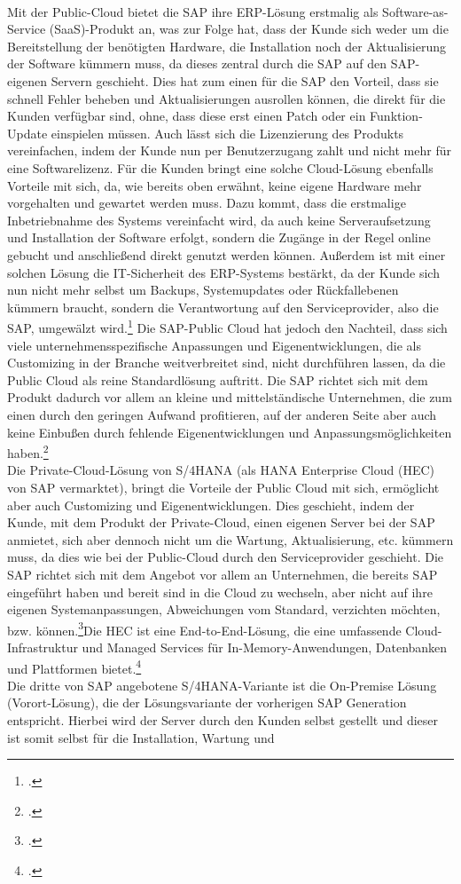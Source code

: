 \\Mit der Public-Cloud bietet die SAP ihre ERP-Lösung erstmalig als Software-as-Service (SaaS)-Produkt an, was zur Folge hat, dass der Kunde sich weder um die Bereitstellung der benötigten Hardware, die Installation noch der Aktualisierung der Software kümmern muss, da dieses zentral durch die SAP auf den SAP-eigenen Servern geschieht. Dies hat zum einen für die SAP den Vorteil, dass sie schnell Fehler beheben und Aktualisierungen ausrollen können, die direkt für die Kunden verfügbar sind, ohne, dass diese erst einen Patch oder ein Funktion-Update einspielen müssen. Auch lässt sich die Lizenzierung des Produkts vereinfachen, indem der Kunde nun per Benutzerzugang zahlt und nicht mehr für eine Softwarelizenz. Für die Kunden bringt eine solche Cloud-Lösung ebenfalls Vorteile mit sich, da, wie bereits oben erwähnt, keine eigene Hardware mehr vorgehalten und gewartet werden muss. Dazu kommt, dass die erstmalige Inbetriebnahme des Systems vereinfacht wird, da auch keine Serveraufsetzung und Installation der Software erfolgt, sondern die Zugänge in der Regel online gebucht und anschließend direkt genutzt werden können. Außerdem ist mit einer solchen Lösung die IT-Sicherheit des ERP-Systems bestärkt, da der Kunde sich nun nicht mehr selbst um Backups, Systemupdates oder Rückfallebenen kümmern braucht, sondern die Verantwortung auf den Serviceprovider, also die SAP, umgewälzt wird.\footcite[Vgl.][]{saas} Die SAP-Public Cloud hat jedoch den Nachteil, dass sich viele unternehmensspezifische Anpassungen und Eigenentwicklungen, die als \glqq{}Customizing\grqq{} in der Branche weitverbreitet sind, nicht durchführen lassen, da die Public Cloud als reine Standardlösung auftritt. Die SAP richtet sich mit dem Produkt dadurch vor allem an kleine und mittelständische Unternehmen, die zum einen durch den geringen Aufwand profitieren, auf der anderen Seite aber auch keine Einbußen durch fehlende Eigenentwicklungen und Anpassungsmöglichkeiten haben.\footcite[Vgl.][]{rz10-s4hana}\\Die Private-Cloud-Lösung von S/4HANA (als \glqq{}HANA Enterprise Cloud (HEC)\grqq{} von SAP vermarktet), bringt die Vorteile der Public Cloud mit sich, ermöglicht aber auch Customizing und Eigenentwicklungen. Dies geschieht, indem der Kunde, mit dem Produkt der Private-Cloud, einen eigenen Server bei der SAP anmietet, sich aber dennoch nicht um die Wartung, Aktualisierung, etc. kümmern muss, da dies wie bei der Public-Cloud durch den Serviceprovider geschieht. Die SAP richtet sich mit dem Angebot vor allem an Unternehmen, die bereits SAP eingeführt haben und bereit sind in die Cloud zu wechseln, aber nicht auf ihre eigenen Systemanpassungen, Abweichungen vom Standard, verzichten möchten, bzw. können.\footcite[Vgl.][]{rz10-hana}\glqq{}Die HEC ist eine End-to-End-Lösung, die eine umfassende Cloud-Infrastruktur und Managed Services für In-Memory-Anwendungen, Datenbanken und Plattformen bietet.\grqq{}\footcite[Vgl.][]{rz10-hana}\\Die dritte von SAP angebotene S/4HANA-Variante ist die On-Premise Lösung (Vorort-Lösung), die der Lösungsvariante der vorherigen SAP Generation entspricht. Hierbei wird der Server durch den Kunden selbst gestellt und dieser ist somit selbst für die Installation, Wartung und 